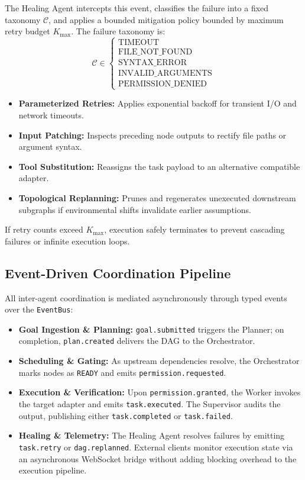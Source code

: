 \documentclass[conference]{IEEEtran}
\begin{document}
The Healing Agent intercepts this event, classifies the failure into a fixed taxonomy $\mathcal{C}$, and applies a bounded mitigation policy bounded by maximum retry budget $K_{\text{max}}$. The failure taxonomy is:
\begin{equation}
\mathcal{C} \in \begin{cases}
\text{TIMEOUT} \\
\text{FILE\_NOT\_FOUND} \\
\text{SYNTAX\_ERROR} \\
\text{INVALID\_ARGUMENTS} \\
\text{PERMISSION\_DENIED}
\end{cases}
\end{equation}
\begin{itemize}
    \item \textbf{Parameterized Retries:} Applies exponential backoff for transient I/O and network timeouts.
    \item \textbf{Input Patching:} Inspects preceding node outputs to rectify file paths or argument syntax.
    \item \textbf{Tool Substitution:} Reassigns the task payload to an alternative compatible adapter.
    \item \textbf{Topological Replanning:} Prunes and regenerates unexecuted downstream subgraphs if environmental shifts invalidate earlier assumptions.
\end{itemize}
If retry counts exceed $K_{\text{max}}$, execution safely terminates to prevent cascading failures or infinite execution loops.

\subsection{Event-Driven Coordination Pipeline}
All inter-agent coordination is mediated asynchronously through typed events over the \texttt{EventBus}:
\begin{itemize}
    \item \textbf{Goal Ingestion \& Planning:} \texttt{goal.submitted} triggers the Planner; on completion, \texttt{plan.created} delivers the DAG to the Orchestrator.
    \item \textbf{Scheduling \& Gating:} As upstream dependencies resolve, the Orchestrator marks nodes as \texttt{READY} and emits \texttt{permission.requested}.
    \item \textbf{Execution \& Verification:} Upon \texttt{permission.granted}, the Worker invokes the target adapter and emits \texttt{task.executed}. The Supervisor audits the output, publishing either \texttt{task.completed} or \texttt{task.failed}.
    \item \textbf{Healing \& Telemetry:} The Healing Agent resolves failures by emitting \texttt{task.retry} or \texttt{dag.replanned}. External clients monitor execution state via an asynchronous WebSocket bridge without adding blocking overhead to the execution pipeline.
\end{itemize}
\end{document}
